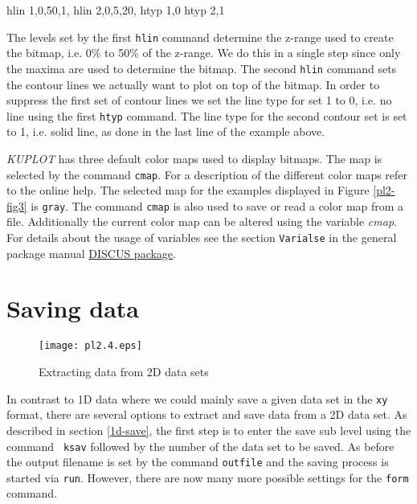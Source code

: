 \begin{MacVerbatim}
    hlin 1,0,50,1,%
    hlin 2,0,5,20,%
    htyp 1,0
    htyp 2,1
\end{MacVerbatim}

The levels set by the first {\tt hlin} command determine the z-range
used to create the bitmap, i.e. 0\% to 50\% of the z-range. We do
this in a single step since only the maxima are used to determine
the bitmap. The second {\tt hlin} command sets the contour lines we
actually want to plot on top of the bitmap. In order to suppress the
first set of contour lines we set the line type for set 1 to 0, i.e.
no line using the first {\tt htyp} command. The line type for the
second contour set is set to 1, i.e. solid line, as done in the last
line of the example above. \par

{\it KUPLOT} has three default color maps used to display bitmaps.
The map is selected by the command {\tt cmap}. For a description of
the different color maps refer to the online help. The selected map
for the examples displayed in Figure \ref{pl2-fig3} is {\tt gray}.
The command {\tt cmap} is also used to save or read a color map from
a file. Additionally the current color map can be altered using the
variable {\it cmap}. For details about the usage of variables see
the section {\tt Varialse} in the general package manual 
\href{./package\_man.pdf}{DISCUS package}.


\section{Saving data \label{2d-save}}

\begin{figure}[!t]
   \centering
   \texttt{[image: pl2.4.eps]}
   \caption{Extracting data from 2D data sets}
   \label{pl2-fig4}
\end{figure}

In contrast to 1D data where we could mainly save a given data set
in the {\tt xy} format, there are several options to extract and
save data from a 2D data set. As described in section \ref{1d-save},
the first step is to enter the save sub level using the command {\tt
ksav} followed by the number of the data set to be saved. As before
the output filename is set by the command {\tt outfile} and the
saving process is started via {\tt run}. However, there are now many
more possible settings for the {\tt form} command.

